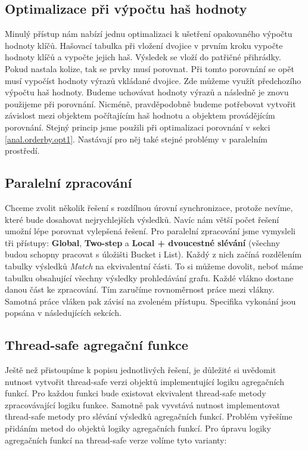\subsection{Optimalizace při výpočtu haš hodnoty} \label{anal.groupby.opt1}

Minulý přístup nám nabízí jednu optimalizaci k ušetření opakovaného výpočtu hodnoty klíčů.
Hašovací tabulka při vložení dvojice v prvním kroku vypočte hodnoty klíčů a vypočte jejich haš.
Výsledek se vloží do patřičné přihrádky.
Pokud nastala kolize, tak se prvky musí porovnat.
Při tomto porovnání se opět musí vypočíst hodnoty výrazů vkládané dvojice.
Zde můžeme využít předchozího výpočtu haš hodnoty.
Budeme uchovávat hodnoty výrazů a následně je znovu použijeme při porovnání.
Nicméně, pravděpodobně budeme potřebovat vytvořit závislost mezi objektem počítajícím haš hodnotu a objektem provádějícím porovnání.
Stejný princip jsme použili při optimalizaci porovnání v sekci \ref{anal.orderby.opt1}.
Nastávají pro něj také stejné problémy v paralelním prostředí.

\subsection{Paralelní zpracování} \label{anal.groupby.paralel}

Chceme zvolit několik řešení s rozdílnou úrovní synchronizace, protože nevíme, které bude dosahovat nejrychlejších výsledků.
Navíc nám větší počet řešení umožní lépe porovnat vylepšená řešení.
Pro paralelní zpracování jsme vymysleli tři přístupy: \textbf{Global}, \textbf{Two-step} a \textbf{Local + dvoucestné slévání} (všechny budou schopny pracovat s úložišti Bucket i List).
Každý z nich začíná rozdělením tabulky výsledků \textit{Match} na ekvivalentní části.
To si můžeme dovolit, neboť máme tabulku obsahující všechny výsledky prohledávání grafu.
Každé vlákno dostane danou část ke zpracování.
Tím zaručíme rovnoměrnost práce mezi vlákny.
Samotná práce vláken pak závisí na zvoleném přístupu.
Specifika vykonání jsou popsána v následujících sekcích.

\subsection{Thread-safe agregační funkce}

Ještě než přistoupíme k popisu jednotlivých řešení, je důležité si uvědomit nutnost vytvořit thread-safe verzi objektů implementující logiku agregačních funkcí.
Pro každou funkci bude existovat ekvivalent thread-safe metody zpracovávající logiku funkce.
Samotně pak vyvstává nutnost implementovat thread-safe metody pro slévání výsledků agregačních funkcí.
Problém vyřešíme přidáním metod do objektů logiky agregačních funkcí.
Pro úpravu logiky agregačních funkcí na thread-safe verze volíme tyto varianty:

